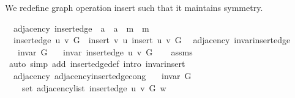 \begin{isabellebody}
\isamarkupfalse%
%
\endisatagproof
{\isafoldproof}%
%
\isadelimproof
\isanewline
%
\endisadelimproof
{}\isamarkupfalse%
%
\begin{isamarkuptext}%
We redefine graph operation insert such that it maintains symmetry.%
\end{isamarkuptext}\isamarkuptrue%
\isamarkupfalse%
\ {\isacharparenleft}{\kern0pt}\ adjacency{\isacharparenright}{\kern0pt}\ insert{\isacharunderscore}{\kern0pt}edge\ {\isacharcolon}{\kern0pt}{\isacharcolon}{\kern0pt}\ {\isachardoublequoteopen}{\isacharprime}{\kern0pt}a\ {\isasymRightarrow}\ {\isacharprime}{\kern0pt}a\ {\isasymRightarrow}\ {\isacharprime}{\kern0pt}m\ {\isasymRightarrow}\ {\isacharprime}{\kern0pt}m{\isachardoublequoteclose}\ \isanewline
\ \ {\isachardoublequoteopen}insert{\isacharunderscore}{\kern0pt}edge\ u\ v\ G\ {\isasymequiv}\ insert{\isacharprime}{\kern0pt}\ v\ u\ {\isacharparenleft}{\kern0pt}insert{\isacharprime}{\kern0pt}\ u\ v\ G{\isacharparenright}{\kern0pt}{\isachardoublequoteclose}\isanewline
\isanewline
{}\isamarkupfalse%
\ {\isacharparenleft}{\kern0pt}\ adjacency{\isacharparenright}{\kern0pt}\ invar{\isacharunderscore}{\kern0pt}insert{\isacharunderscore}{\kern0pt}edge{\isacharcolon}{\kern0pt}\isanewline
\ \ \ {\isachardoublequoteopen}invar\ G{\isachardoublequoteclose}\isanewline
\ \ \ {\isachardoublequoteopen}invar\ {\isacharparenleft}{\kern0pt}insert{\isacharunderscore}{\kern0pt}edge\ u\ v\ G{\isacharparenright}{\kern0pt}{\isachardoublequoteclose}\isanewline
%
\isadelimproof
\ \ %
\endisadelimproof
%
\isatagproof
{}\isamarkupfalse%
\ assms\isanewline
\ \ \isamarkupfalse%
\ {\isacharparenleft}{\kern0pt}auto\ simp\ add{\isacharcolon}{\kern0pt}\ insert{\isacharunderscore}{\kern0pt}edge{\isacharunderscore}{\kern0pt}def\ intro{\isacharcolon}{\kern0pt}\ invar{\isacharunderscore}{\kern0pt}insert{\isacharprime}{\kern0pt}{\isacharparenright}{\kern0pt}%
\endisatagproof
{\isafoldproof}%
%
\isadelimproof
\isanewline
%
\endisadelimproof
\isanewline
{}\isamarkupfalse%
\ {\isacharparenleft}{\kern0pt}\ adjacency{\isacharparenright}{\kern0pt}\ adjacency{\isacharunderscore}{\kern0pt}insert{\isacharunderscore}{\kern0pt}edge{\isacharunderscore}{\kern0pt}cong{\isacharcolon}{\kern0pt}\isanewline
\ \ \ {\isachardoublequoteopen}invar\ G{\isachardoublequoteclose}\isanewline
\ \ \isanewline
\ \ \ \ {\isachardoublequoteopen}set\ {\isacharparenleft}{\kern0pt}adjacency{\isacharunderscore}{\kern0pt}list\ {\isacharparenleft}{\kern0pt}insert{\isacharunderscore}{\kern0pt}edge\ u\ v\ G{\isacharparenright}{\kern0pt}\ w{\isacharparenright}{\kern0pt}\ {\isacharequal}{\kern0pt}\isanewline

\end{isabellebody}
